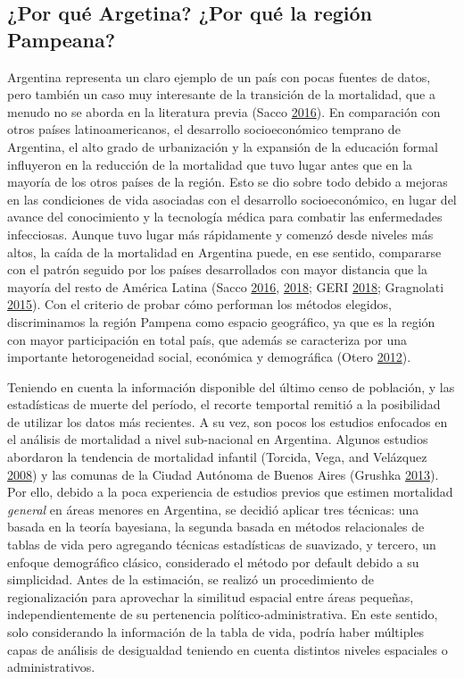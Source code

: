 \documentclass[12pt,]{article}
\begin{document}
\hypertarget{por-quuxe9-argetina-por-quuxe9-la-regiuxf3n-pampeana}{%
\subsection{¿Por qué Argetina? ¿Por qué la región
Pampeana?}\label{por-quuxe9-argetina-por-quuxe9-la-regiuxf3n-pampeana}}

Argentina representa un claro ejemplo de un país con pocas fuentes de
datos, pero también un caso muy interesante de la transición de la
mortalidad, que a menudo no se aborda en la literatura previa (Sacco
\protect\hyperlink{ref-Sacco2016}{2016}). En comparación con otros
países latinoamericanos, el desarrollo socioeconómico temprano de
Argentina, el alto grado de urbanización y la expansión de la educación
formal influyeron en la reducción de la mortalidad que tuvo lugar antes
que en la mayoría de los otros países de la región. Esto se dio sobre
todo debido a mejoras en las condiciones de vida asociadas con el
desarrollo socioeconómico, en lugar del avance del conocimiento y la
tecnología médica para combatir las enfermedades infecciosas. Aunque
tuvo lugar más rápidamente y comenzó desde niveles más altos, la caída
de la mortalidad en Argentina puede, en ese sentido, compararse con el
patrón seguido por los países desarrollados con mayor distancia que la
mayoría del resto de América Latina (Sacco
\protect\hyperlink{ref-Sacco2016}{2016},
\protect\hyperlink{ref-SaccoBorges2018}{2018}; GERI
\protect\hyperlink{ref-GeriMoscoso2018}{2018}; Gragnolati
\protect\hyperlink{ref-Gragnolati2015}{2015}). Con el criterio de probar
cómo performan los métodos elegidos, discriminamos la región Pampena
como espacio geográfico, ya que es la región con mayor participación en
total país, que además se caracteriza por una importante hetorogeneidad
social, económica y demográfica (Otero
\protect\hyperlink{ref-Otero2012}{2012}).

Teniendo en cuenta la información disponible del último censo de
población, y las estadísticas de muerte del período, el recorte
temportal remitió a la posibilidad de utilizar los datos más recientes.
A su vez, son pocos los estudios enfocados en el análisis de mortalidad
a nivel sub-nacional en Argentina. Algunos estudios abordaron la
tendencia de mortalidad infantil (Torcida, Vega, and Velázquez
\protect\hyperlink{ref-Torcida2008}{2008}) y las comunas de la Ciudad
Autónoma de Buenos Aires (Grushka
\protect\hyperlink{ref-Grushka2013}{2013}). Por ello, debido a la poca
experiencia de estudios previos que estimen mortalidad \emph{general} en
áreas menores en Argentina, se decidió aplicar tres técnicas: una basada
en la teoría bayesiana, la segunda basada en métodos relacionales de
tablas de vida pero agregando técnicas estadísticas de suavizado, y
tercero, un enfoque demográfico clásico, considerado el método por
default debido a su simplicidad. Antes de la estimación, se realizó un
procedimiento de regionalización para aprovechar la similitud espacial
entre áreas pequeñas, independientemente de su pertenencia
político-administrativa. En este sentido, solo considerando la
información de la tabla de vida, podría haber múltiples capas de
análisis de desigualdad teniendo en cuenta distintos niveles espaciales
o administrativos.
\end{document}
